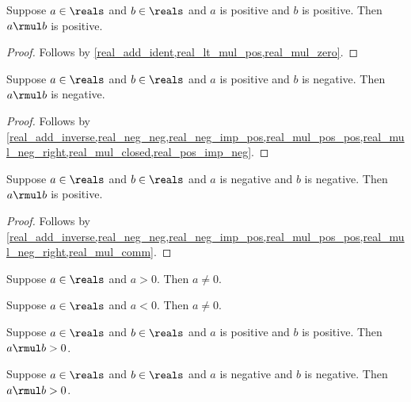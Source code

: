 \begin{lemma}\label{real_mul_pos_pos}
    Suppose $a\in\reals$ and $b\in\reals$ and $a$ is positive and $b$ is positive.
    Then $a \rmul b$ is positive.
\end{lemma}
\begin{proof}
    Follows by \cref{real_add_ident,real_lt_mul_pos,real_mul_zero}.
\end{proof}

\begin{lemma}\label{real_mul_pos_neg}
    Suppose $a\in\reals$ and $b\in\reals$ and $a$ is positive and $b$ is negative.
    Then $a \rmul b$ is negative.
\end{lemma}
\begin{proof}
    Follows by \cref{real_add_inverse,real_neg_neg,real_neg_imp_pos,real_mul_pos_pos,real_mul_neg_right,real_mul_closed,real_pos_imp_neg}.
\end{proof}

\begin{lemma}\label{real_mul_neg_neg}
    Suppose $a\in\reals$ and $b\in\reals$ and $a$ is negative and $b$ is negative.
    Then $a \rmul b$ is positive.
\end{lemma}
\begin{proof}
    Follows by \cref{real_add_inverse,real_neg_neg,real_neg_imp_pos,real_mul_pos_pos,real_mul_neg_right,real_mul_comm}.
\end{proof}


\begin{lemma}\label{real_pos_nonzero}
    Suppose $a\in\reals$ and $a > 0$.
    Then $a \neq 0$.
\end{lemma}

\begin{lemma}\label{real_neg_nonzero}
    Suppose $a\in\reals$ and $a < 0$.
    Then $a \neq 0$.
\end{lemma}

\begin{proposition}\label{real_mul_pos_pos_gt}
    Suppose $a\in\reals$ and $b\in\reals$ and $a$ is positive and $b$ is positive.
    Then $a \rmul b > 0$.
\end{proposition}

\begin{proposition}\label{real_mul_neg_neg_gt}
    Suppose $a\in\reals$ and $b\in\reals$ and $a$ is negative and $b$ is negative.
    Then $a \rmul b > 0$.
\end{proposition}

